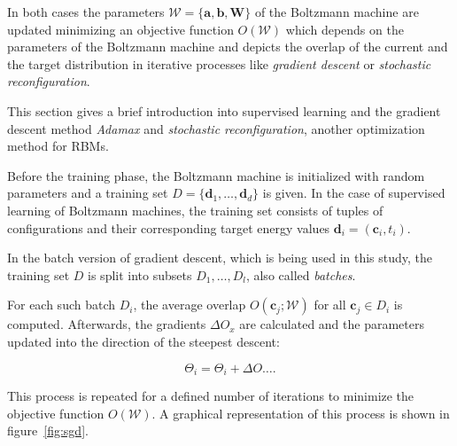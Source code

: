 In both cases the parameters $\mathcal{W} = \{\bm{a},\bm{b},\bm{W}\}$ of the Boltzmann machine are updated minimizing 
an objective function $O(\mathcal{W})$ which depends on the parameters of the Boltzmann machine and 
depicts the overlap of the current and the target distribution in iterative processes like 
\textit{gradient descent} or \textit{stochastic reconfiguration}.

This section gives a brief introduction into supervised learning and the gradient descent method \textit{Adamax} \cite{kingma2014adam} and \textit{stochastic reconfiguration}, another optimization method for RBMs.

Before the training phase, the Boltzmann machine is initialized with random parameters and a training set 
$D=\{\bm{d}_1,\dots,\bm{d}_d\}$ is given. In the case of supervised learning of Boltzmann machines, the training set consists of tuples of configurations and their corresponding target energy values $\bm{d}_i= (\bm{c}_i, t_i)$.

In the batch version of gradient descent, which is being used in this study, the training set $D$ is 
split into subsets $D_1, \dots, D_l$, also called \textit{batches}.

For each such batch $D_i$, the average overlap $O(\bm{c}_j; \mathcal{W})$ for all $\bm{c}_j \in D_i$
is computed. Afterwards, the gradients $\Delta O_{x}$ are calculated and the parameters updated into
the direction of the steepest descent:

\begin{equation}
    \label{eq:sgd}
    \Theta_i = \Theta_i + \Delta O \dots.
\end{equation}

This process is repeated for a defined number of iterations to minimize the objective function $O(\mathcal{W})$.
A graphical representation of this process is shown in figure~\ref{fig:sgd}.

